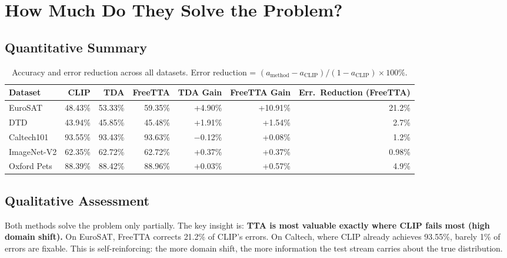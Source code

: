 \documentclass[12pt,a4paper]{article}
\newcommand{\1}{\mathbf{1}}
\begin{document}
\section{How Much Do They Solve the Problem?}

\subsection{Quantitative Summary}

\begin{table}[H]
\centering
\caption{Accuracy and error reduction across all datasets. Error reduction = $(a_\text{method} - a_\text{CLIP})/(1 - a_\text{CLIP}) \times 100\%$.}
\label{tab:accuracy_summary}
\begin{tabular}{@{}lrrrrrr@{}}
\toprule
Dataset & CLIP & TDA & FreeTTA & TDA Gain & FreeTTA Gain & Err.\ Reduction (FreeTTA) \\
\midrule
EuroSAT     & 48.43\% & 53.33\% & 59.35\% & +4.90\% & +10.91\% & 21.2\% \\
DTD         & 43.94\% & 45.85\% & 45.48\% & +1.91\% & +1.54\%  & 2.7\%  \\
Caltech101  & 93.55\% & 93.43\% & 93.63\% & $-$0.12\% & +0.08\% & 1.2\% \\
ImageNet-V2 & 62.35\% & 62.72\% & 62.72\% & +0.37\% & +0.37\%  & 0.98\% \\
Oxford Pets & 88.39\% & 88.42\% & 88.96\% & +0.03\% & +0.57\%  & 4.9\%  \\
\bottomrule
\end{tabular}
\end{table}

\subsection{Qualitative Assessment}

Both methods solve the problem only partially.
The key insight is: \textbf{TTA is most valuable exactly where CLIP fails most (high domain shift).}
On EuroSAT, FreeTTA corrects 21.2\% of CLIP's errors.
On Caltech, where CLIP already achieves 93.55\%, barely 1\% of errors are fixable.
This is self-reinforcing: the more domain shift, the more information the test stream carries about the true distribution.

\end{document}
